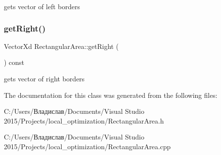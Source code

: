 gets vector of left borders \mbox{\label{class_rectangular_area_a1c8b68b80a6e15f1ee879db1166910b6}} 
\subsubsection{get\+Right()}
{\footnotesize\ttfamily Vector\+Xd Rectangular\+Area\+::get\+Right (\begin{DoxyParamCaption}{ }\end{DoxyParamCaption}) const}

gets vector of right borders 

The documentation for this class was generated from the following files\+:\begin{DoxyCompactItemize}
\item 
C\+:/\+Users/Владислав/\+Documents/\+Visual Studio 2015/\+Projects/local\+\_\+optimization/Rectangular\+Area.\+h\item 
C\+:/\+Users/Владислав/\+Documents/\+Visual Studio 2015/\+Projects/local\+\_\+optimization/Rectangular\+Area.\+cpp\end{DoxyCompactItemize}

